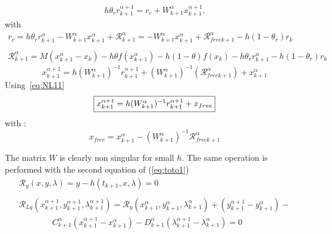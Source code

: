 \begin{equation}
   \begin{array}{l}
 h \theta _r  r^{\alpha+1}_{k+1} = r_c + W^{\alpha}_{k+1} x^{\alpha+1}_{k+1}
 .\label{eq:NL11} 
 \end{array}
\end{equation}
with 
\begin{equation}
   \begin{array}{l}
r_c = h \theta _r r^{\alpha}_{k+1} - W^{\alpha}_{k+1} x^{\alpha}_{k+1} + \mathcal R
^{\alpha}_{k+1}=- W^{\alpha}_{k+1} x^{\alpha}_{k+1} + \mathcal R_{free k+1} ^{\alpha} - h(1-\theta_r)r_k\\ \\
\mathcal R ^{\alpha}_{k+1}=M( x^{\alpha}_{k+1} - x_k) -h \theta f(x^{\alpha}_{k+1})-h(1-\theta)f(x_k)
- h \theta _r r^{\alpha}_{k+1} -h(1- \theta _r)r_k

 \end{array}
   \end{equation}
\[x^{\alpha+1}_{k+1} = h(W^{\alpha}_{k+1})^{-1}r^{\alpha+1}_{k+1} +(W^{\alpha}_{k+1})^{-1}(\mathcal
R_{free k+1} ^{\alpha})+x^{\alpha}_{k+1}\]
Using~\ref{eq:NL11}
\[\fbox{$x^{\alpha+1}_{k+1} = h(W^{\alpha}_{k+1})^{-1}r^{\alpha+1}_{k+1} +x_{free}$}\]
with :
\[x_{free}=x^{\alpha}_{k+1}-(W^{\alpha}_{k+1})^{-1}\mathcal R_{freek+1}^{\alpha}\]

The matrix $W$ is clearly non singular for small $h$.
The same operation is performed with the second equation of (\ref{eq:toto1})
\begin{equation}
   \label{eq:NL9}
   \begin{array}{l}
      \mathcal R_y(x,y,\lambda)=y-h(t_{k+1},x,\lambda) =0\\ \\
      \mathcal R_{Ly}(x^{\alpha+1}_{k+1},y^{\alpha+1}_{k+1},\lambda^{\alpha+1}_{k+1}) = \mathcal
      R_{y}(x^{\alpha}_{k+1},y^{\alpha}_{k+1},\lambda^{\alpha}_{k+1}) +
      (y^{\alpha+1}_{k+1}-y^{\alpha}_{k+1})- \\ \qquad \qquad
      C^{\alpha}_{k+1}(x^{\alpha+1}_{k+1}-x^{\alpha}_{k+1}) - D^{\alpha}_{k+1}(\lambda^{\alpha+1}_{k+1}-\lambda^{\alpha}_{k+1})=0\\
      
 \end{array}
\end{equation}

